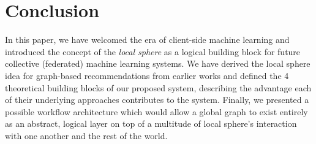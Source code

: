\documentclass{llncs}
\begin{document}
\section{Conclusion}
\label{sect:conclusion}

In this paper, we have welcomed the era of client-side machine learning and introduced the concept of the \textit{local sphere} as a logical building block for future collective (federated) machine learning systems. We have derived the local sphere idea for graph-based recommendations from earlier works and defined the 4 theoretical building blocks of our proposed system, describing the advantage each of their underlying approaches contributes to the system. Finally, we presented a possible workflow architecture which would allow a global graph to exist entirely as an abstract, logical layer on top of a multitude of local sphere's interaction with one another and the rest of the world.

\newpage



\end{document}
